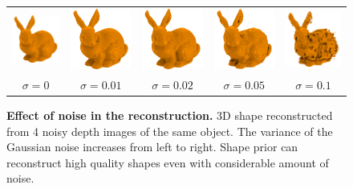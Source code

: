 \begin{figure}[t]
\centering
\setlength{\tabcolsep}{0pt}
\begin{tabular}{ccccc}
\includegraphics[width=.2\linewidth]{dsp/figs/bunny_deep_4depth_0noise.png} &
\includegraphics[width=.2\linewidth]{dsp/figs/bunny_deep_4depth_001noise.png} &
\includegraphics[width=.2\linewidth]{dsp/figs/bunny_deep_4depth_002noise.png} &
\includegraphics[width=.2\linewidth]{dsp/figs/bunny_deep_4depth_005noise.png} &
\includegraphics[width=.2\linewidth]{dsp/figs/bunny_deep_4depth_01noise.png} \\
$\sigma=0$ &
$\sigma=0.01$ &
$\sigma=0.02$ &
$\sigma=0.05$ &
$\sigma=0.1$
\end{tabular}
    \caption{\small \label{fig:depthnoise} \textbf{Effect of noise in the reconstruction.}
		3D shape reconstructed from 4 noisy depth images of the same object.
		The variance of the Gaussian noise increases from left to right.
		Shape prior can reconstruct high quality shapes even with considerable amount of noise.
    }
\vspace{0.41in}
\end{figure}

